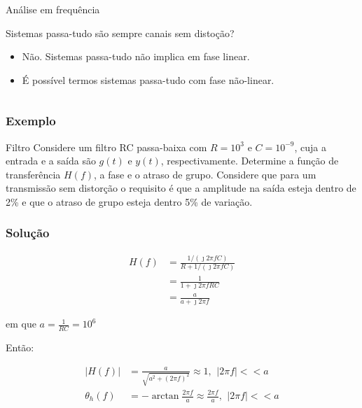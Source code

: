 \documentclass[10pt,hyperref={pdfpagemode=FullScreen},aspectratio=169]{beamer}
\begin{document}
\begin{frame}
\begin{columns}[T]
\begin{column}{0.5\textwidth
      }
\begin{block}{Análise em frequência}
        \end{block}
        \begin{block}{Sistemas passa-tudo são sempre canais sem distoção?}
          \begin{itemize}
            \item Não. Sistemas passa-tudo não implica em fase linear. 
   
            \item É possível termos sistemas passa-tudo com fase não-linear.
          \end{itemize}
        \end{block}
    \end{column}
  \end{columns}

\end{frame}


\begin{frame}
  \frametitle{Exemplo}

  \begin{block}{Filtro}
    Considere um filtro RC passa-baixa com $R=10^3$ e $C = 10^{-9}$, cuja a entrada e a saída são $g(t)$ e $y(t)$, respectivamente. Determine a função de transferência $H(f)$, a fase e o atraso de grupo. Considere que para um transmissão sem distorção o requisito é que a amplitude na saída esteja dentro de 2\% e que o atraso de grupo esteja dentro 5\% de variação.
  \end{block}

\end{frame}

\begin{frame}
  \frametitle{Solução}

  
\begin{align*}
H(f) &= \frac{1/(\jmath 2\pi fC)}{R + 1/(\jmath 2\pi fC)} \\
    & = \frac{1}{1 + \jmath 2\pi f RC } \\
    & = \frac{a}{a+ \jmath 2\pi f }
\end{align*}


em que $a = \frac{1}{RC} = 10 ^6$ 

Então:


\begin{align*}
|H(f)| & = \frac{a}{\sqrt{a ^2+  (2\pi f)^2 }} \approx 1, \,\ |2\pi f| << a \\
\theta _h (f) &= - \arctan {\frac{2\pi f}{a}} \approx \frac{2\pi f}{a}, \,\ |2\pi f| << a 
\end{align*}

\end{frame}
\end{document}
